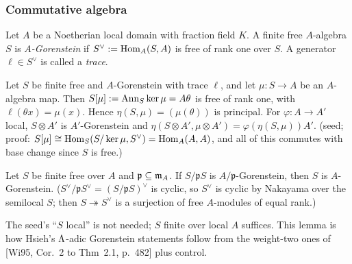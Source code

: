 \subsubsection{Commutative algebra}\label{ss:s06-ca}
Let $A$ be a Noetherian local domain with fraction field $K$. A finite free $A$-algebra $S$ is \emph{$A$-Gorenstein} if
$S^\vee:=\operatorname{Hom}_A(S,A)$ is free of rank one over $S$. A generator $\ell\in S^\vee$ is called a \emph{trace}.

\begin{lemma}\label{lem:s06-S}
Let $S$ be finite free and $A$-Gorenstein with trace $\ell$, and let $\mu:S\to A$ be an $A$-algebra map. Then
$S[\mu]:=\operatorname{Ann}_S\ker\mu=A\theta$ is free of rank one, with $\ell(\theta x)=\mu(x)$. Hence $\eta(S,\mu)=(\mu(\theta))$ is principal.
For $\varphi:A\to A'$ local, $S\otimes A'$ is $A'$-Gorenstein and $\eta(S\otimes A',\mu\otimes A')=\varphi(\eta(S,\mu))A'$. \stproved{}
(seed; proof: $S[\mu]\cong\operatorname{Hom}_S(S/\ker\mu,S^\vee)=\operatorname{Hom}_A(A,A)$, and all of this commutes with base change since $S$ is free.)
\end{lemma}

\begin{lemma}\label{lem:s06-G}
Let $S$ be finite free over $A$ and $\mathfrak p\subseteq\mathfrak{m}_A$. If $S/\mathfrak pS$ is $A/\mathfrak p$-Gorenstein, then $S$ is
$A$-Gorenstein. \stproved{} ($S^\vee/\mathfrak pS^\vee=(S/\mathfrak pS)^\vee$ is cyclic, so $S^\vee$ is cyclic by Nakayama over
the semilocal $S$; then $S\twoheadrightarrow S^\vee$ is a surjection of free $A$-modules of equal rank.)
\end{lemma}
\noindent The seed's ``$S$ local'' is not needed; $S$ finite over local $A$ suffices. This lemma is how Hsieh's $\Lambda$-adic
Gorenstein statements follow from the weight-two ones of [Wi95, Cor.~2 to Thm~2.1, p.~482]
 plus control.

